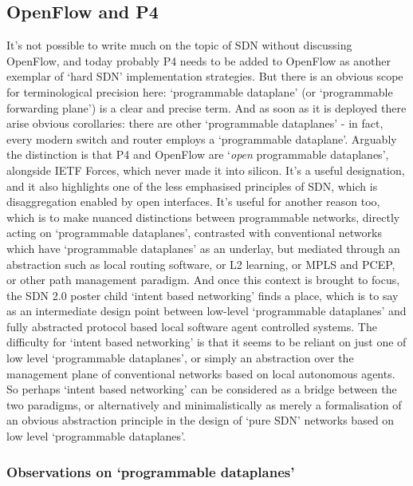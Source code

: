 \subsection{OpenFlow and P4}

It's not possible to write much on the topic of SDN without discussing OpenFlow, and today probably P4 needs to be added to OpenFlow as another exemplar of ‘hard SDN’ implementation strategies.
But there is an obvious scope for terminological precision here: ‘programmable dataplane’ (or ‘programmable forwarding plane’) is a clear and precise term.
And as soon as it is deployed there arise obvious corollaries: there are other ‘programmable dataplanes’ - in fact, every modern switch and router employs a ‘programmable dataplane’.
Arguably the distinction is that P4 and OpenFlow are ‘\textit{open} programmable dataplanes’, alongside IETF Forces, which never made it into silicon.
It's a useful designation, and it also highlights one of the less emphasised principles of SDN, which is disaggregation enabled by open interfaces.
It’s useful for another reason too, which is to make nuanced distinctions between programmable networks, directly acting on ‘programmable dataplanes’, contrasted with conventional networks which have ‘programmable dataplanes’ as an underlay, but mediated through an abstraction such as local routing software, or L2 learning, or MPLS and PCEP, or other path management paradigm.
And once this context is brought to focus, the SDN 2.0 poster child ‘intent based networking’ finds a place, which is to say as an intermediate design point between low-level ‘programmable dataplanes’ and fully abstracted protocol based local software agent controlled systems.
The difficulty for ‘intent based networking’ is that it seems to be reliant on just one of low level ‘programmable dataplanes’, or simply an abstraction over the management plane of conventional networks based on local autonomous agents.
So perhaps ‘intent based networking’ can be considered as a bridge between the two paradigms, or alternatively and minimalistically as merely a formalisation of an obvious abstraction principle in the design of ‘pure SDN’ networks based on low level ‘programmable dataplanes’.

\subsubsection{Observations on ‘programmable dataplanes’}

